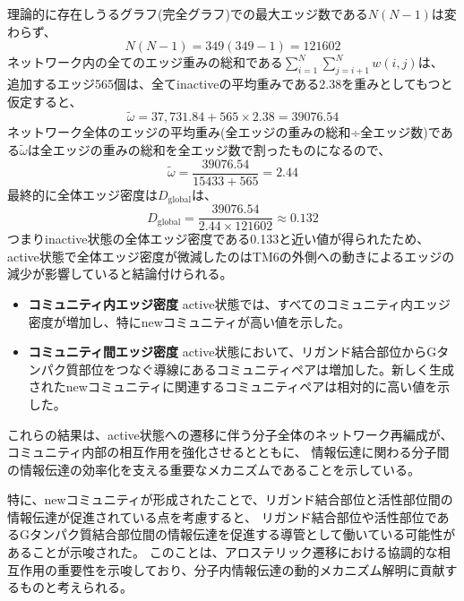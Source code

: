 理論的に存在しうるグラフ(完全グラフ)での最大エッジ数である$N(N-1)$は変わらず、
\begin{equation}
  N(N-1) = 349(349-1) = 121602
\end{equation}
ネットワーク内の全てのエッジ重みの総和である$\sum_{i=1}^{N} \sum_{j=i+1}^{N} w(i, j)$は、
追加するエッジ565個は、全てinactiveの平均重みである2.38を重みとしてもつと仮定すると、
\begin{equation}
  \tilde{\omega} = 37,731.84+565 \times 2.38 = 39076.54
\end{equation}
ネットワーク全体のエッジの平均重み(全エッジの重みの総和÷全エッジ数)である$\tilde{\omega}$は全エッジの重みの総和を全エッジ数で割ったものになるので、
\begin{equation}
  \tilde{\omega} = \frac{39076.54}{15433+565} = 2.44
\end{equation}
最終的に全体エッジ密度は$D_{\text{global}}$は、
\begin{equation}
  D_{\text{global}} = \frac{39076.54}{2.44 \times 121602} \approx 0.132
\end{equation}
つまりinactive状態の全体エッジ密度である0.133と近い値が得られたため、
active状態で全体エッジ密度が微減したのはTM6の外側への動きによるエッジの減少が影響していると結論付けられる。



\begin{itemize}
  \item \textbf{コミュニティ内エッジ密度}  
  active状態では、すべてのコミュニティ内エッジ密度が増加し、特にnewコミュニティが高い値を示した。
  \item \textbf{コミュニティ間エッジ密度}  
  active状態において、リガンド結合部位からGタンパク質部位をつなぐ導線にあるコミュニティペアは増加した。新しく生成されたnewコミュニティに関連するコミュニティペアは相対的に高い値を示した。
\end{itemize}


これらの結果は、active状態への遷移に伴う分子全体のネットワーク再編成が、
コミュニティ内部の相互作用を強化させるとともに、
情報伝達に関わる分子間の情報伝達の効率化を支える重要なメカニズムであることを示している。

特に、newコミュニティが形成されたことで、リガンド結合部位と活性部位間の情報伝達が促進されている点を考慮すると、
リガンド結合部位や活性部位であるGタンパク質結合部位間の情報伝達を促進する導管として働いている可能性があることが示唆された。
このことは、アロステリック遷移における協調的な相互作用の重要性を示唆しており、分子内情報伝達の動的メカニズム解明に貢献するものと考えられる。



